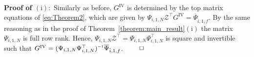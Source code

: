 \textbf{Proof of $\mathrm{(i)}:$} Similarly as before, $G^\mathrm{IV}$ is determined by the top matrix equations of \eqref{eq:Theorem2}, which are given by $\Psi_{i,1,N}\mathcal{Z}^\top G^\mathrm{IV}=\overline{\Psi}_{\hat{i},1,f}$. By the same reasoning as in the proof of Theorem~\ref{theorem:main_result}$\mathrm{(i)}$ the matrix $\Psi_{i,1,N}$ is full row rank. Hence, $\Psi_{i,1,N}\mathcal{Z}^\top=\Psi_{i,1,N}\Psi_{i,1,N}^\top$ is square and invertible such that $G^\mathrm{IV} = (\Psi_{i,1,N}\Psi_{i,1,N}^\top)\inv \overline{\Psi}_{\hat{i},1,f}$. $\hfill \qed$\\
